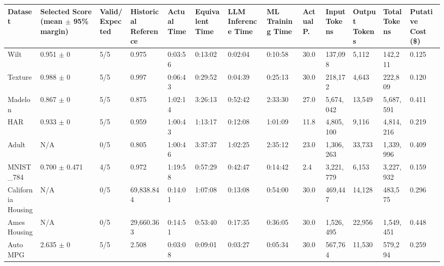 \begin{tabular}{lllllllllllll}
\hline
Dataset & Selected Score (mean \ensuremath{\pm} 95\% margin) & Valid/Expected & Historical Reference & Actual Time & Equivalent Time & LLM Inference Time & ML Training Time & Actual P. & Input Tokens & Output Tokens & Total Tokens & Putative Cost (\$) \\
\hline
Wilt & 0.951 \ensuremath{\pm} 0 & 5/5 & 0.975 & 0:03:56 & 0:13:02 & 0:02:04 & 0:10:58 & 30.0 & 137,098 & 5,112 & 142,211 & 0.125 \\
Texture & 0.988 \ensuremath{\pm} 0 & 5/5 & 0.997 & 0:06:43 & 0:29:52 & 0:04:39 & 0:25:13 & 30.0 & 218,172 & 4,643 & 222,809 & 0.120 \\
Madelon & 0.867 \ensuremath{\pm} 0 & 5/5 & 0.875 & 1:02:14 & 3:26:13 & 0:52:42 & 2:33:30 & 27.0 & 5,674,042 & 13,549 & 5,687,591 & 0.411 \\
HAR & 0.933 \ensuremath{\pm} 0 & 5/5 & 0.959 & 1:00:43 & 1:13:17 & 0:12:08 & 1:01:09 & 11.8 & 4,805,100 & 9,116 & 4,814,216 & 0.219 \\
Adult & N/A & 0/5 & 0.805 & 1:00:46 & 3:37:37 & 1:02:25 & 2:35:12 & 23.0 & 1,306,263 & 33,733 & 1,339,996 & 0.409 \\
MNIST\_784 & 0.700 \ensuremath{\pm} 0.471 & 4/5 & 0.972 & 1:19:58 & 0:57:29 & 0:42:47 & 0:14:42 & 2.4 & 3,221,779 & 6,153 & 3,227,932 & 0.159 \\
California Housing & N/A & 0/5 & 69,838.844 & 0:14:01 & 1:07:08 & 0:13:08 & 0:54:00 & 30.0 & 469,447 & 14,128 & 483,575 & 0.296 \\
Ames Housing & N/A & 0/5 & 29,660.363 & 0:14:51 & 0:53:40 & 0:17:35 & 0:36:05 & 30.0 & 1,526,495 & 22,956 & 1,549,451 & 0.448 \\
Auto MPG & 2.635 \ensuremath{\pm} 0 & 5/5 & 2.508 & 0:03:08 & 0:09:01 & 0:03:27 & 0:05:34 & 30.0 & 567,764 & 11,530 & 579,294 & 0.259 \\
\hline
\end{tabular}
